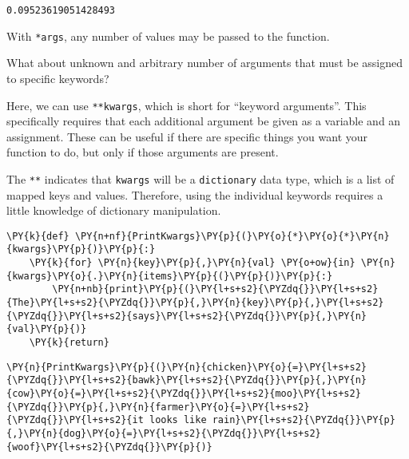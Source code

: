             \begin{tcolorbox}[breakable, size=fbox, boxrule=.5pt, pad at break*=1mm, opacityfill=0]
\begin{Verbatim}[commandchars=\\\{\}]
0.09523619051428493
\end{Verbatim}
\end{tcolorbox}
        
    With \texttt{*args}, any number of values may be passed to the function.

What about unknown and arbitrary number of arguments that must be
assigned to specific keywords?

Here, we can use \texttt{**kwargs}, which is short for ``keyword
arguments''. This specifically requires that each additional argument be
given as a variable and an assignment. These can be useful if there are
specific things you want your function to do, but only if those
arguments are present.

The \texttt{**} indicates that \texttt{kwargs} will be a
\texttt{dictionary} data type, which is a list of mapped keys and
values. Therefore, using the individual keywords requires a little
knowledge of dictionary manipulation.

    \begin{tcolorbox}[breakable, size=fbox, boxrule=1pt, pad at break*=1mm,colback=cellbackground, colframe=cellborder]
\begin{Verbatim}[commandchars=\\\{\}]
\PY{k}{def} \PY{n+nf}{PrintKwargs}\PY{p}{(}\PY{o}{*}\PY{o}{*}\PY{n}{kwargs}\PY{p}{)}\PY{p}{:}
    \PY{k}{for} \PY{n}{key}\PY{p}{,}\PY{n}{val} \PY{o+ow}{in} \PY{n}{kwargs}\PY{o}{.}\PY{n}{items}\PY{p}{(}\PY{p}{)}\PY{p}{:}
        \PY{n+nb}{print}\PY{p}{(}\PY{l+s+s2}{\PYZdq{}}\PY{l+s+s2}{The}\PY{l+s+s2}{\PYZdq{}}\PY{p}{,}\PY{n}{key}\PY{p}{,}\PY{l+s+s2}{\PYZdq{}}\PY{l+s+s2}{says}\PY{l+s+s2}{\PYZdq{}}\PY{p}{,}\PY{n}{val}\PY{p}{)}
    \PY{k}{return}
\end{Verbatim}
\end{tcolorbox}

    \begin{tcolorbox}[breakable, size=fbox, boxrule=1pt, pad at break*=1mm,colback=cellbackground, colframe=cellborder]
\begin{Verbatim}[commandchars=\\\{\}]
\PY{n}{PrintKwargs}\PY{p}{(}\PY{n}{chicken}\PY{o}{=}\PY{l+s+s2}{\PYZdq{}}\PY{l+s+s2}{bawk}\PY{l+s+s2}{\PYZdq{}}\PY{p}{,}\PY{n}{cow}\PY{o}{=}\PY{l+s+s2}{\PYZdq{}}\PY{l+s+s2}{moo}\PY{l+s+s2}{\PYZdq{}}\PY{p}{,}\PY{n}{farmer}\PY{o}{=}\PY{l+s+s2}{\PYZdq{}}\PY{l+s+s2}{it looks like rain}\PY{l+s+s2}{\PYZdq{}}\PY{p}{,}\PY{n}{dog}\PY{o}{=}\PY{l+s+s2}{\PYZdq{}}\PY{l+s+s2}{woof}\PY{l+s+s2}{\PYZdq{}}\PY{p}{)}
\end{Verbatim}
\end{tcolorbox}

